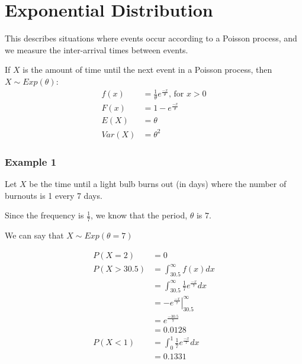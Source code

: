             \section{Exponential Distribution} %
            \label{sec:exponential_distribution}
                This describes situations where events occur according to a Poisson process, and we measure the inter-arrival times between events.

                If $X$ is the amount of time until the next event in a Poisson process, then $X \sim Exp(\theta)$:
                \begin{align*}
                    f(x) &= \frac{1}{\theta} e^{\frac{-x}{\theta}} \text{, for $x > 0$} \\
                    F(x) &= 1 - e^{\frac{-x}{\theta}} \\
                    E(X) &= \theta \\
                    Var(X) &= \theta^2
                \end{align*}

                \subsubsection{Example 1} %
                \label{ssub:example_1}
                    Let $X$ be the time until a light bulb burns out (in days) where the number of burnouts is 1 every 7 days.

                    Since the frequency is $\frac{1}{7}$, we know that the period, $\theta$ is $7$.

                    We can say that $X \sim Exp(\theta = 7)$

                    \begin{align*}
                        P(X = 2) &= 0 \\
                        P(X > 30.5) &= \int_{30.5}^\infty f(x)dx \\
                        &= \int_{30.5}^\infty \frac{1}{7} e^{\frac{-x}{7}}dx \\
                        &= \left. -e^{\frac{-x}{7}} \right|_{30.5}^\infty \\
                        &= e^{\frac{-30.5}{7}} \\
                        &= 0.0128 \\
                        P(X < 1) &= \int_0^1 \frac{1}{7}  e^{\frac{-x}{7}} dx \\
                        &= 0.1331
                    \end{align*}
